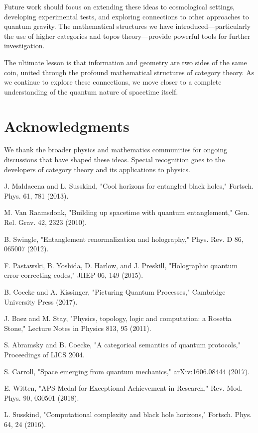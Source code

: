 \documentclass[11pt,a4paper]{article}
\begin{document}
Future work should focus on extending these ideas to cosmological settings, developing experimental tests, and exploring connections to other approaches to quantum gravity. The mathematical structures we have introduced—particularly the use of higher categories and topos theory—provide powerful tools for further investigation.

The ultimate lesson is that information and geometry are two sides of the same coin, united through the profound mathematical structures of category theory. As we continue to explore these connections, we move closer to a complete understanding of the quantum nature of spacetime itself.

\section*{Acknowledgments}

We thank the broader physics and mathematics communities for ongoing discussions that have shaped these ideas. Special recognition goes to the developers of category theory and its applications to physics.

\begin{thebibliography}{99}

J. Maldacena and L. Susskind, "Cool horizons for entangled black holes," Fortsch. Phys. 61, 781 (2013).

M. Van Raamsdonk, "Building up spacetime with quantum entanglement," Gen. Rel. Grav. 42, 2323 (2010).

B. Swingle, "Entanglement renormalization and holography," Phys. Rev. D 86, 065007 (2012).

F. Pastawski, B. Yoshida, D. Harlow, and J. Preskill, "Holographic quantum error-correcting codes," JHEP 06, 149 (2015).

B. Coecke and A. Kissinger, "Picturing Quantum Processes," Cambridge University Press (2017).

J. Baez and M. Stay, "Physics, topology, logic and computation: a Rosetta Stone," Lecture Notes in Physics 813, 95 (2011).

S. Abramsky and B. Coecke, "A categorical semantics of quantum protocols," Proceedings of LICS 2004.

S. Carroll, "Space emerging from quantum mechanics," arXiv:1606.08444 (2017).

E. Witten, "APS Medal for Exceptional Achievement in Research," Rev. Mod. Phys. 90, 030501 (2018).

L. Susskind, "Computational complexity and black hole horizons," Fortsch. Phys. 64, 24 (2016).

\end{thebibliography}
\end{document}
